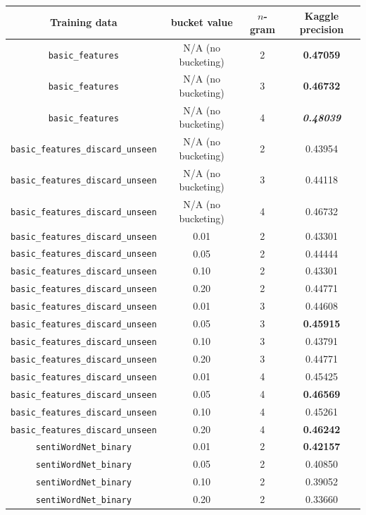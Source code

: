 \documentclass{article}
\begin{document}
{\small
\begin{tabular}{|c|c|c|c|}\hline
Training data & bucket value & $n$-gram & Kaggle precision\\\hline
\texttt{basic\_features} & N/A (no bucketing) & 2 & \textbf{0.47059}\\\hline
\texttt{basic\_features} & N/A (no bucketing) & 3 & \textbf{0.46732}\\\hline
\texttt{basic\_features} & N/A (no bucketing) & 4 & \textbf{\textit{0.48039}}\\\hline\hline
\texttt{basic\_features\_discard\_unseen} & N/A (no bucketing) & 2 & 0.43954\\\hline
\texttt{basic\_features\_discard\_unseen} & N/A (no bucketing) & 3 & 0.44118\\\hline
\texttt{basic\_features\_discard\_unseen} & N/A (no bucketing) & 4 & 0.46732\\\hline
\texttt{basic\_features\_discard\_unseen} & 0.01 & 2 & 0.43301\\
\texttt{basic\_features\_discard\_unseen} & 0.05 & 2 & 0.44444\\
\texttt{basic\_features\_discard\_unseen} & 0.10 & 2 & 0.43301\\
\texttt{basic\_features\_discard\_unseen} & 0.20 & 2 & 0.44771\\\hline
\texttt{basic\_features\_discard\_unseen} & 0.01 & 3 & 0.44608\\
\texttt{basic\_features\_discard\_unseen} & 0.05 & 3 & \textbf{0.45915}\\
\texttt{basic\_features\_discard\_unseen} & 0.10 & 3 & 0.43791\\
\texttt{basic\_features\_discard\_unseen} & 0.20 & 3 & 0.44771\\\hline
\texttt{basic\_features\_discard\_unseen} & 0.01 & 4 & 0.45425\\
\texttt{basic\_features\_discard\_unseen} & 0.05 & 4 & \textbf{0.46569}\\
\texttt{basic\_features\_discard\_unseen} & 0.10 & 4 & 0.45261\\
\texttt{basic\_features\_discard\_unseen} & 0.20 & 4 & \textbf{0.46242}\\\hline\hline
\texttt{sentiWordNet\_binary} & 0.01 & 2 & \textbf{0.42157}\\
\texttt{sentiWordNet\_binary} & 0.05 & 2 & 0.40850\\
\texttt{sentiWordNet\_binary} & 0.10 & 2 & 0.39052\\
\texttt{sentiWordNet\_binary} & 0.20 & 2 & 0.33660\\\hline

\end{tabular}}
\end{document}
